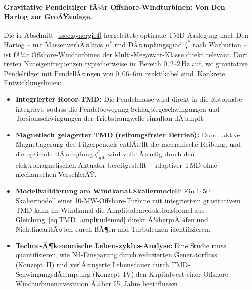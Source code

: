 ﻿\documentclass[12pt, a4paper]{report}
\theoremstyle{definition}
\theoremstyle{remark}
\begin{document}
\paragraph{Gravitative Pendeltilger fÃ¼r Offshore-Windturbinen: Von Den Hartog
zur GroÃŸanlage.}
Die in Abschnitt~\ref{ssec:synergie4} hergeleitete optimale TMD-Auslegung nach
Den Hartog \cite{denhartog1956} -- mit MassenverhÃ¤ltnis $\mu^*$ und DÃ¤mpfungsgrad
$\zeta^*$ nach Warburton \cite{warburton1982} -- ist fÃ¼r Offshore-Windturbinen
der Multi-Megawatt-Klasse direkt relevant. Dort treten Nuteigenfrequenzen
typischerweise im Bereich $0{,}2$--$2\,\si{\hertz}$ auf, wo gravitative
Pendeltilger mit PendellÃ¤ngen von $0{,}06$--$6\,\si{\metre}$ praktikabel sind.
Konkrete Entwicklungslinien:
\begin{itemize}
  \item \textbf{Integrierter Rotor-TMD:} Die Pendelmasse wird direkt in die
        Rotornabe integriert, sodass die Pendelbe\-wegung Schlagbiegeschwingungen
        und Torsionsschwingungen der Triebstrangwelle simultan dÃ¤mpft.
  \item \textbf{Magnetisch gelagerter TMD (reibungsfreier Betrieb):} Durch
        aktive Magnetlagerung des Tilgerpendels entfÃ¤llt die mechanische Reibung,
        und die optimale DÃ¤mpfung $\zeta^*_{\text{opt}}$ wird vollstÃ¤ndig durch
        den elektromagnetischen Aktuator bereitgestellt -- adaptiver TMD ohne
        mechanischen VerschleiÃŸ.
  \item \textbf{Modellvalidierung am Windkanal-Skaliermodell:} Ein $1:50$-Skaliermodell
        einer 10-MW-Offshore-Turbine mit integriertem gravitativem TMD kann im
        Windkanal die Amplitudenreduktionsformel aus
        Gleichung~\eqref{eq:TMD_amplitudenred} direkt Ã¼berprÃ¼fen und
        NichtlinearitÃ¤ten durch BÃ¶en und Turbulenzen identifizieren.
  \item \textbf{Techno-Ã¶konomische Lebenszyklus-Analyse:} Eine Studie muss
        quantifizieren, wie Nd-Einsparung durch reduzierten Generatorfluss
        (Konzept~II) und verlÃ¤ngerte Lebensdauer durch TMD-SchwingungsdÃ¤mpfung
        (Konzept~IV) den Kapitalwert einer Offshore-Windturbineninvestition Ã¼ber
        25~Jahre beeinflussen \cite{muller2002}.
\end{itemize}
\end{document}
